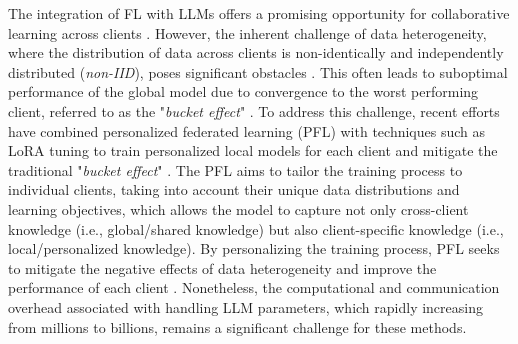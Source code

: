 \documentclass[sigconf]{acmart}
\begin{document}
The integration of FL with LLMs offers a promising opportunity for collaborative learning across clients \cite{mcmahan2017communication, zhang2024towards}. However, the inherent challenge of data heterogeneity, where the distribution of data across clients is non-identically and independently distributed (\textit{non-IID}), poses significant obstacles \cite{ma2022layer, chen2023fedsoup}. This often leads to suboptimal performance of the global model due to convergence to the worst performing client, referred to as the "\textit{bucket effect}" \cite{bai2024federated}. To address this challenge, recent efforts have combined personalized federated learning (PFL) with techniques such as LoRA tuning to train personalized local models for each client and mitigate the traditional "\textit{bucket effect}" \cite{yi2023fedlora, wu2024fedlora}. The PFL aims to tailor the training process to individual clients, taking into account their unique data distributions and learning objectives, which allows the model to capture  not only cross-client knowledge (i.e., global/shared knowledge) but also client-specific knowledge (i.e., local/personalized knowledge). By personalizing the training process, PFL seeks to mitigate the negative effects of data heterogeneity and improve the performance of each client \cite{huang2021personalized}. Nonetheless, the computational and communication overhead associated with handling LLM parameters, which rapidly increasing from millions to billions, remains a significant challenge for these methods.
\end{document}
